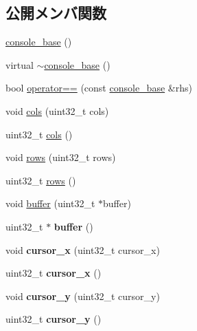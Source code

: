 \subsection*{公開メンバ関数}
\begin{DoxyCompactItemize}
\item 
\hyperlink{classconsole__base_ab72690282352009b2eca56c12d0e6529}{console\+\_\+base} ()
\item 
virtual \hyperlink{classconsole__base_a956275f5f7c00148939cfe5bab999b7a}{$\sim$console\+\_\+base} ()
\item 
bool \hyperlink{classconsole__base_a28633feb8f1724680c255166ee9b2e1a}{operator==} (const \hyperlink{classconsole__base}{console\+\_\+base} \&rhs)
\item 
void \hyperlink{classconsole__base_a625c2d1eede5ce568765ba84b2e30c6a}{cols} (uint32\+\_\+t cols)
\item 
uint32\+\_\+t \hyperlink{classconsole__base_a9e9ea675def1c8df2defea7fb7d2c982}{cols} ()
\item 
void \hyperlink{classconsole__base_aefdc51ef2ad888e5de55429e59ddb9a3}{rows} (uint32\+\_\+t rows)
\item 
uint32\+\_\+t \hyperlink{classconsole__base_a6124ee0455ba292763d23cb137dc9929}{rows} ()
\item 
void \hyperlink{classconsole__base_a98b7835fa6b24b8d8e54f5531406a305}{buffer} (uint32\+\_\+t $\ast$buffer)
\item 
\hypertarget{classconsole__base_a9bdd8fb03a4380e2793fa35298bb3fc4}{}uint32\+\_\+t $\ast$ {\bfseries buffer} ()\label{classconsole__base_a9bdd8fb03a4380e2793fa35298bb3fc4}

\item 
\hypertarget{classconsole__base_a9dce56c685c21f12ca54bb73e5dffcb4}{}void {\bfseries cursor\+\_\+x} (uint32\+\_\+t cursor\+\_\+x)\label{classconsole__base_a9dce56c685c21f12ca54bb73e5dffcb4}

\item 
\hypertarget{classconsole__base_ad59a91b66625ce8c248932772354383f}{}uint32\+\_\+t {\bfseries cursor\+\_\+x} ()\label{classconsole__base_ad59a91b66625ce8c248932772354383f}

\item 
\hypertarget{classconsole__base_aba47a7cadd9a68dc6f7a98c6a3080a72}{}void {\bfseries cursor\+\_\+y} (uint32\+\_\+t cursor\+\_\+y)\label{classconsole__base_aba47a7cadd9a68dc6f7a98c6a3080a72}

\item 
\hypertarget{classconsole__base_a6182707c71b93d9e94a621bb81856141}{}uint32\+\_\+t {\bfseries cursor\+\_\+y} ()\label{classconsole__base_a6182707c71b93d9e94a621bb81856141}


\end{DoxyCompactItemize}
